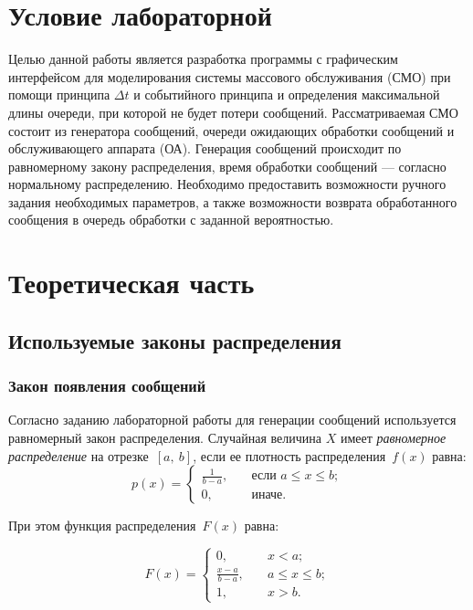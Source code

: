 \section{Условие лабораторной}

Целью данной работы является разработка программы с графическим интерфейсом для моделирования системы массового обслуживания (СМО) при помощи принципа $\Delta t$ и событийного принципа и определения максимальной длины очереди, при которой не будет потери сообщений. Рассматриваемая СМО состоит из генератора сообщений, очереди ожидающих обработки сообщений и обслуживающего аппарата (ОА). Генерация сообщений происходит по равномерному закону распределения, время обработки сообщений --- согласно нормальному распределению. Необходимо предоставить возможности ручного задания необходимых параметров, а также возможности возврата обработанного сообщения в очередь обработки с заданной вероятностью.


\section{Теоретическая часть}

\subsection{Используемые законы распределения}

\subsubsection*{Закон появления сообщений}

Согласно заданию лабораторной работы для генерации сообщений используется равномерный закон распределения.
Случайная величина $X$ имеет \textit{равномерное распределение} на отрезке~$[a,~b]$, если ее плотность распределения~$f(x)$ равна:
\begin{equation}
	p(x) =
	\begin{cases}
		\displaystyle\frac{1}{b - a}, & \quad \text{если } a \leq x \leq b;\\
		0,  & \quad \text{иначе}.
	\end{cases}
\end{equation}

При этом функция распределения~$F(x)$ равна:

\begin{equation}
	F(x) =
	\begin{cases}
		0,  & \quad x < a;\\
		\displaystyle\frac{x - a}{b - a}, & \quad a \leq x \leq b;\\
		1,  & \quad x > b.
	\end{cases}
\end{equation}

